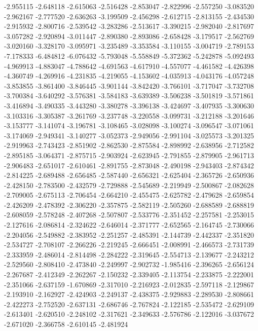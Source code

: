 -2.955115
-2.648118
-2.615063
-2.516428
-2.853047
-2.822996
-2.557250
-3.083520
-2.962167
-2.777520
-2.636263
-3.199509
-2.456298
-2.612715
-2.813155
-2.434530
-2.915932
-2.800716
-2.539542
-3.283286
-2.513617
-3.390215
-2.982040
-2.817697
-3.057282
-2.920894
-3.011447
-2.890380
-2.893086
-2.658428
-3.179517
-2.562769
-3.020160
-3.328170
-3.095971
-3.235489
-3.353584
-3.110155
-3.004719
-2.789153
-7.178333
-6.484812
-6.076432
-5.793048
-5.558849
-5.372362
-5.242878
-5.092493
-4.969913
-4.883047
-4.788642
-4.691563
-4.617910
-4.557077
-4.461582
-4.426398
-4.360749
-4.269916
-4.231835
-4.219055
-4.153602
-4.035913
-4.043176
-4.057248
-3.853855
-3.861400
-3.846445
-3.901144
-3.842420
-3.766101
-3.717047
-3.732708
-3.700384
-3.640292
-3.576381
-3.584183
-3.639389
-3.506238
-3.501819
-3.571861
-3.416894
-3.490335
-3.443280
-3.380278
-3.396138
-3.424697
-3.407935
-3.300630
-3.103316
-3.305387
-3.261769
-3.237748
-3.220558
-3.099731
-3.212188
-3.201646
-3.153777
-3.141074
-3.196781
-3.108465
-3.028098
-3.100274
-3.096547
-3.071061
-3.174069
-2.949341
-3.140277
-3.052373
-2.949056
-2.991104
-3.025573
-3.201325
-2.919963
-2.743423
-2.851902
-2.862530
-2.875584
-2.898992
-2.638956
-2.712582
-2.895185
-3.064371
-2.875715
-2.903924
-2.623945
-2.791855
-2.879905
-2.961713
-2.906483
-2.651017
-2.610461
-2.891755
-2.873048
-2.490198
-2.943403
-2.874342
-2.814225
-2.689488
-2.656485
-2.587440
-2.656321
-2.625404
-2.365726
-2.650936
-2.428150
-2.783500
-2.432579
-2.729888
-2.545689
-2.219949
-2.500867
-2.082628
-2.709005
-2.675113
-2.706454
-2.664210
-2.455475
-2.625782
-2.479628
-2.659854
-2.426209
-2.478392
-2.306220
-2.357875
-2.582119
-2.505260
-2.688589
-2.688819
-2.608059
-2.578248
-2.407268
-2.507807
-2.533776
-2.351452
-2.257581
-2.253015
-2.127616
-2.086814
-2.324622
-2.646014
-2.371777
-2.652565
-2.164745
-2.730066
-2.204056
-2.549882
-2.383952
-2.251257
-2.485391
-2.144739
-2.442337
-2.351820
-2.534727
-2.708107
-2.266226
-2.219245
-2.666451
-2.008991
-2.466573
-2.731739
-2.333959
-2.486014
-2.814498
-2.284222
-2.319645
-2.554713
-2.139677
-2.243212
-2.529560
-2.808410
-2.473840
-2.249997
-2.902732
-1.985416
-2.396265
-2.656124
-2.267687
-2.412349
-2.262267
-2.150232
-2.339405
-2.113754
-2.233875
-2.222001
-2.351066
-2.637159
-1.670869
-2.317010
-2.216923
-2.012835
-2.597118
-2.129867
-2.193910
-2.162927
-2.424903
-2.249137
-2.438375
-2.929883
-2.289530
-2.808661
-2.422273
-2.752520
-2.637131
-2.686746
-2.767824
-2.122185
-2.535472
-2.629109
-2.613401
-2.620510
-2.248102
-2.317621
-2.349633
-2.576786
-2.122016
-3.037672
-2.671020
-2.366758
-2.610145
-2.481924
